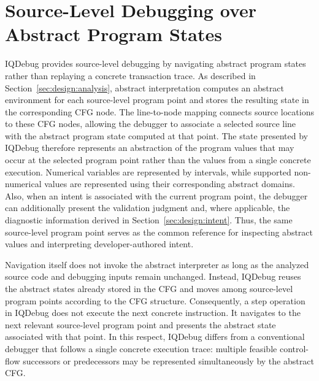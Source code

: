 \documentclass[11pt,oneside]{report}
\theoremstyle{plain}
\theoremstyle{definition}
\theoremstyle{remark}
\begin{document}
\section{Source-Level Debugging over Abstract Program States}\label{sec:design:debugging}
IQDebug provides source-level debugging by navigating abstract program states rather than replaying a concrete transaction trace. As described in Section~\ref{sec:design:analysis}, abstract interpretation computes an abstract environment for each source-level program point and stores the resulting state in the corresponding CFG node. The line-to-node mapping connects source locations to these CFG nodes, allowing the debugger to associate a selected source line with the abstract program state computed at that point.
The state presented by IQDebug therefore represents an abstraction of the program values that may occur at the selected program point rather than the values from a single concrete execution. Numerical variables are represented by intervals, while supported non-numerical values are represented using their corresponding abstract domains. Also, when an intent is associated with the current program point, the debugger can additionally present the validation judgment and, where applicable, the diagnostic information derived in Section~\ref{sec:design:intent}. Thus, the same source-level program point serves as the common reference for inspecting abstract values and interpreting developer-authored intent.

Navigation itself does not invoke the abstract interpreter as long as the analyzed source code and debugging inputs remain unchanged. Instead, IQDebug reuses the abstract states already stored in the CFG and moves among source-level program points according to the CFG structure. Consequently, a step operation in IQDebug does not execute the next concrete instruction. It navigates to the next relevant source-level program point and presents the abstract state associated with that point. In this respect, IQDebug differs from a conventional debugger that follows a single concrete execution trace: multiple feasible control-flow successors or predecessors may be represented simultaneously by the abstract CFG.
\end{document}
